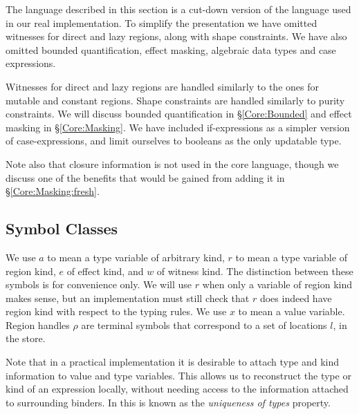 \bigskip
\bigskip
The language described in this section is a cut-down version of the language used in our real implementation. To simplify the presentation we have omitted witnesses for direct and lazy regions, along with shape constraints. We have also omitted bounded quantification, effect masking, algebraic data types and case expressions. 

Witnesses for direct and lazy regions are handled similarly to the ones for mutable and constant regions. Shape constraints are handled similarly to purity constraints. We will discuss bounded quantification in \S\ref{Core:Bounded} and effect masking in \S\ref{Core:Masking}.  We have included if-expressions as a simpler version of case-expressions, and limit ourselves to booleans as the only updatable type. 

Note also that closure information is not used in the core language, though we discuss one of the benefits that would be gained from adding it in \S\ref{Core:Masking:fresh}.

\subsection{Symbol Classes}
We use $a$ to mean a type variable of arbitrary kind, $r$ to mean a type variable of region kind, $e$ of effect kind, and $w$ of witness kind. The distinction between these symbols is for convenience only. We will use $r$ when only a variable of region kind makes sense, but an implementation must still check that $r$ does indeed have region kind with respect to the typing rules. We use $x$ to mean a value variable. Region handles $\rho$ are terminal symbols that correspond to a set of locations $l$, in the store. 

Note that in a practical implementation it is desirable to attach type and kind information to value and type variables. This allows us to reconstruct the type or kind of an expression locally, without needing access to the information attached to surrounding binders. In \cite{jay:scrap-type} this is known as the \emph{uniqueness of types} property.
